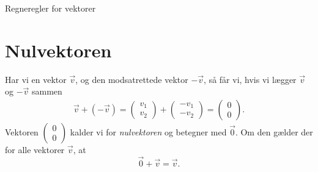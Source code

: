 
\begin{center}
\Huge
Regneregler for vektorer
\end{center}

\section*{Nulvektoren}
Har vi en vektor $\vec{v}$, og den modsatrettede vektor $-\vec{v}$, så får vi, hvis vi lægger $\vec{v}$ og $-\vec{v}$ sammen
\begin{align*}
\vec{v}+(-\vec{v}) = \begin{pmatrix}
v_1\\v_2
\end{pmatrix} + \begin{pmatrix}
-v_1 \\-v_2
\end{pmatrix} = \begin{pmatrix}
0\\0
\end{pmatrix}.
\end{align*}
Vektoren $\begin{pmatrix}0\\0

\end{pmatrix}$ kalder vi for\textit{ nulvektoren} og betegner med $\vec{0}$. Om den gælder der for alle vektorer $\vec{v}$, at $$\vec{0}+\vec{v} = \vec{v}.$$

